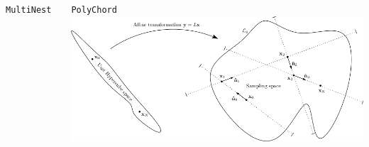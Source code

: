 \documentclass[aspectratio=169, handout]{beamer}
\begin{document}
\begin{frame}
\begin{columns}
\begin{block}{\texttt{MultiNest}~}
        \end{block}%
        \vspace{-5pt}
        \begin{block}{\texttt{PolyChord}~}
            \includegraphics[width=\textwidth]{figures/polychord.png}
        \end{block}



    \end{columns}
\end{frame}
\end{document}
